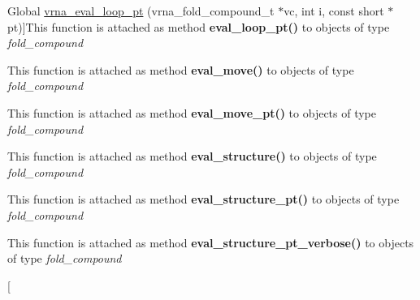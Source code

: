 \begin{DoxyRefList}
%
Global \hyperlink{group__eval_ga730ba4df55c02fd530a0cddd49faf760}{vrna\+\_\+eval\+\_\+loop\+\_\+pt} (vrna\+\_\+fold\+\_\+compound\+\_\+t $\ast$vc, int i, const short $\ast$pt)]This function is attached as method {\bfseries eval\+\_\+loop\+\_\+pt()} to objects of type {\itshape fold\+\_\+compound}  
\item[\label{wrappers__wrappers000031}%
\Hypertarget{wrappers__wrappers000031}%
Global \hyperlink{group__eval_gaff1b9e4f4d17b434b0a822fe783672c1}{vrna\+\_\+eval\+\_\+move} (vrna\+\_\+fold\+\_\+compound\+\_\+t $\ast$vc, const char $\ast$structure, int m1, int m2)]This function is attached as method {\bfseries eval\+\_\+move()} to objects of type {\itshape fold\+\_\+compound}  
\item[\label{wrappers__wrappers000032}%
\Hypertarget{wrappers__wrappers000032}%
Global \hyperlink{group__eval_ga123dabc119ea98c968a5e903cc46f0fb}{vrna\+\_\+eval\+\_\+move\+\_\+pt} (vrna\+\_\+fold\+\_\+compound\+\_\+t $\ast$vc, short $\ast$pt, int m1, int m2)]This function is attached as method {\bfseries eval\+\_\+move\+\_\+pt()} to objects of type {\itshape fold\+\_\+compound}  
\item[\label{wrappers__wrappers000025}%
\Hypertarget{wrappers__wrappers000025}%
Global \hyperlink{group__eval_ga58f199f1438d794a265f3b27fc8ea631}{vrna\+\_\+eval\+\_\+structure} (vrna\+\_\+fold\+\_\+compound\+\_\+t $\ast$vc, const char $\ast$structure)]This function is attached as method {\bfseries eval\+\_\+structure()} to objects of type {\itshape fold\+\_\+compound}  
\item[\label{wrappers__wrappers000026}%
\Hypertarget{wrappers__wrappers000026}%
Global \hyperlink{group__eval_gadbd09372ddfd7a450bbd590c96a6bfe4}{vrna\+\_\+eval\+\_\+structure\+\_\+pt} (vrna\+\_\+fold\+\_\+compound\+\_\+t $\ast$vc, const short $\ast$pt)]This function is attached as method {\bfseries eval\+\_\+structure\+\_\+pt()} to objects of type {\itshape fold\+\_\+compound}  
\item[\label{wrappers__wrappers000028}%
\Hypertarget{wrappers__wrappers000028}%
Global \hyperlink{group__eval_ga8a517cfeeae8c376ae7b1e0c401d38b4}{vrna\+\_\+eval\+\_\+structure\+\_\+pt\+\_\+verbose} (vrna\+\_\+fold\+\_\+compound\+\_\+t $\ast$vc, const short $\ast$pt, F\+I\+LE $\ast$file)]This function is attached as method {\bfseries eval\+\_\+structure\+\_\+pt\+\_\+verbose()} to objects of type {\itshape fold\+\_\+compound}  
\item[\label{wrappers__wrappers000027}%
%

\end{DoxyRefList}
